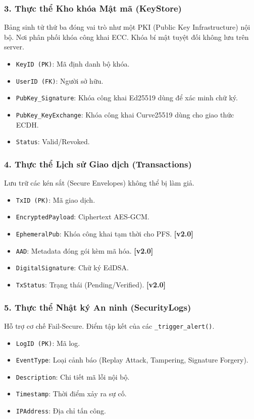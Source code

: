 \documentclass[11pt,a4paper]{article}
\begin{document}
\subsubsection{3. Thực thể Kho khóa Mật mã (KeyStore)}
Bảng sinh tử thứ ba đóng vai trò như một PKI (Public Key Infrastructure) nội bộ. Nơi phân phối khóa công khai ECC. Khóa bí mật tuyệt đối không lưu trên server.
\begin{itemize}[noitemsep]
    \item \texttt{KeyID (PK)}: Mã định danh bộ khóa.
    \item \texttt{UserID (FK)}: Người sở hữu.
    \item \texttt{PubKey\_Signature}: Khóa công khai Ed25519 dùng để xác minh chữ ký.
    \item \texttt{PubKey\_KeyExchange}: Khóa công khai Curve25519 dùng cho giao thức ECDH.
    \item \texttt{Status}: Valid/Revoked.
\end{itemize}

\subsubsection{4. Thực thể Lịch sử Giao dịch (Transactions)}
Lưu trữ các kén sắt (Secure Envelopes) không thể bị làm giả.
\begin{itemize}[noitemsep]
    \item \texttt{TxID (PK)}: Mã giao dịch.
    \item \texttt{EncryptedPayload}: Ciphertext AES-GCM.
    \item \texttt{EphemeralPub}: Khóa công khai tạm thời cho PFS. \textbf{[v2.0]}
    \item \texttt{AAD}: Metadata đóng gói kèm mã hóa. \textbf{[v2.0]}
    \item \texttt{DigitalSignature}: Chữ ký EdDSA.
    \item \texttt{TxStatus}: Trạng thái (Pending/Verified). \textbf{[v2.0]}
\end{itemize}

\subsubsection{5. Thực thể Nhật ký An ninh (SecurityLogs)}
Hỗ trợ cơ chế Fail-Secure. Điểm tập kết của các \texttt{\_trigger\_alert()}.
\begin{itemize}[noitemsep]
    \item \texttt{LogID (PK)}: Mã log.
    \item \texttt{EventType}: Loại cảnh báo (Replay Attack, Tampering, Signature Forgery).
    \item \texttt{Description}: Chi tiết mã lỗi nội bộ.
    \item \texttt{Timestamp}: Thời điểm xảy ra sự cố.
    \item \texttt{IPAddress}: Địa chỉ tấn công.
\end{itemize}
\end{document}

